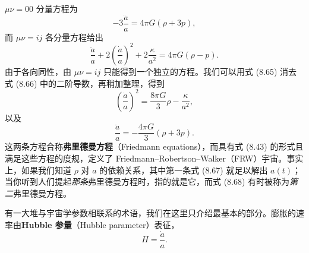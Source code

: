 $\mu\nu=00$ 分量方程为
\begin{equation*}
-3\frac{\ddot{a}}{a} = 4\pi G(\rho + 3p),
\tag{8.65}
\end{equation*}
而 $\mu\nu=ij$ 各分量方程给出
\begin{equation*}
\frac{\ddot{a}}{a} + 2\left(\frac{\dot{a}}{a}\right)^{2} + 2\frac{\kappa}{a^{2}} = 4\pi G(\rho - p).
\tag{8.66}
\end{equation*}
由于各向同性，由 $\mu\nu=ij$ 只能得到一个独立的方程。我们可以用式 (8.65) 消去式 (8.66) 中的二阶导数，再稍加整理，得到
\begin{equation*}
\boxed{\,\left(\frac{\dot{a}}{a}\right)^{2} = \frac{8\pi G}{3}\rho - \frac{\kappa}{a^{2}},\,}
\tag{8.67}
\end{equation*}
以及
\begin{equation*}
\boxed{\,\frac{\ddot{a}}{a} = -\frac{4\pi G}{3}(\rho + 3p).\,}
\tag{8.68}
\end{equation*}
这两条方程合称\textbf{弗里德曼方程}（Friedmann equations），而具有式 (8.43) 的形式且满足这些方程的度规，定义了 Friedmann--Robertson--Walker（FRW）宇宙。事实上，如果我们知道 $\rho$ 对 $a$ 的依赖关系，其中第一条式 (8.67) 就足以解出 $a(t)$；当你听到人们提起\emph{那条}弗里德曼方程时，指的就是它，而式 (8.68) 有时被称为\emph{第二}弗里德曼方程。

有一大堆与宇宙学参数相联系的术语，我们在这里只介绍最基本的部分。膨胀的速率由\textbf{Hubble 参量}（Hubble parameter）表征，
\begin{equation*}
\boxed{\,H = \frac{\dot{a}}{a}.\,}
\tag{8.69}
\end{equation*}

